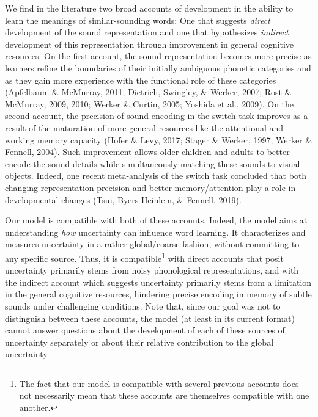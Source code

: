\documentclass[english,,man]{apa6}
\let\rmarkdownfootnote\footnote%
\def\footnote{\protect\rmarkdownfootnote}
\begin{document}
We find in the literature two broad accounts of development in the ability to learn the meanings of similar-sounding words: One that suggests \emph{direct} development of the sound representation and one that hypothesizes \emph{indirect} development of this representation through improvement in general cognitive resources. On the first account, the sound representation becomes more precise as learners refine the boundaries of their initially ambiguous phonetic categories and as they gain more experience with the functional role of these categories (Apfelbaum \& McMurray, 2011; Dietrich, Swingley, \& Werker, 2007; Rost \& McMurray, 2009, 2010; Werker \& Curtin, 2005; Yoshida et al., 2009). On the second account, the precision of sound encoding in the switch task improves as a result of the maturation of more general resources like the attentional and working memory capacity (Hofer \& Levy, 2017; Stager \& Werker, 1997; Werker \& Fennell, 2004). Such improvement allows older children and adults to better encode the sound details while simultaneously matching these sounds to visual objects. Indeed, one recent meta-analysis of the switch task concluded that both changing representation precision and better memory/attention play a role in developmental changes (Tsui, Byers-Heinlein, \& Fennell, 2019).

Our model is compatible with both of these accounts. Indeed, the model aims at understanding \emph{how} uncertainty can influence word learning. It characterizes and measures uncertainty in a rather global/coarse fashion, without committing to any specific source. Thus, it is compatible\footnote{The fact that our model is compatible with several previous accounts does not necessarily mean that these accounts are themselves compatible with one another.} with direct accounts that posit uncertainty primarily stems from noisy phonological representations, and with the indirect account which suggests uncertainty primarily stems from a limitation in the general cognitive resources, hindering precise encoding in memory of subtle sounds under challenging conditions. Note that, since our goal was not to distinguish between these accounts, the model (at least in its current format) cannot answer questions about the development of each of these sources of uncertainty separately or about their relative contribution to the global uncertainty.
\end{document}
